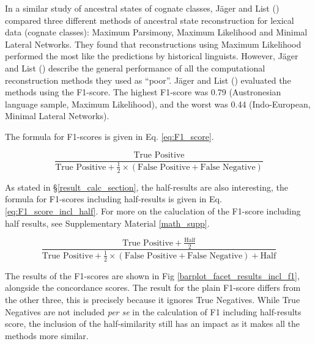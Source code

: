 \documentclass[12pt,letterpaper]{article}
\begin{document}
In a similar study of ancestral states of cognate classes, J\"ager and List (\citeyear{jager2018using}) compared three different methods of ancestral state reconstruction for lexical data (cognate classes): Maximum Parsimony, Maximum Likelihood and Minimal Lateral Networks. They found that reconstructions using Maximum Likelihood performed the most like the predictions by historical linguists. However, J\"ager and List (\citeyear{jager2018using}) describe the general performance of all the computational reconstruction methods they used as ``poor''. J\"ager and List (\citeyear{jager2018using}) evaluated the methods using the F1-score. The highest F1-score was 0.79 (Austronesian language sample, Maximum Likelihood), and the worst was 0.44 (Indo-European, Minimal Lateral Networks).

The formula for F1-scores is given in Eq. \ref{eq:F1_score}.

\begin{equation}\label{eq:F1_score}
\frac{\text{True Positive} }
{\text{True Positive} + \frac{1}{2}\times(\text{False Positive} + \text{False Negative})}
\end{equation}

As stated in §\ref{result_calc_section}, the half-results are also interesting, the formula for F1-scores including half-results is given in Eq. \ref{eq:F1_score_incl_half}. For more on the caluclation of the F1-score including half results, see Supplementary Material \ref{math_supp}.

\begin{equation}\label{eq:F1_score_incl_half}
\frac{\text{True Positive} +  \frac{\text{Half}}{2}} 
{\text{True Positive} + \frac{1}{2}\times(\text{False Positive} + \text{False Negative}) + \text{Half}}
\end{equation}

The results of the F1-scores are shown in Fig \ref{barplot_facet_results_incl_f1}, alongside the concordance scores. The result for the plain F1-score differs from the other three, this is precisely because it ignores True Negatives. While True Negatives are not included \emph{per se} in the calculation of F1 including half-results score, the inclusion of the half-similarity still has an impact as it makes all the methods more similar.
\end{document}

